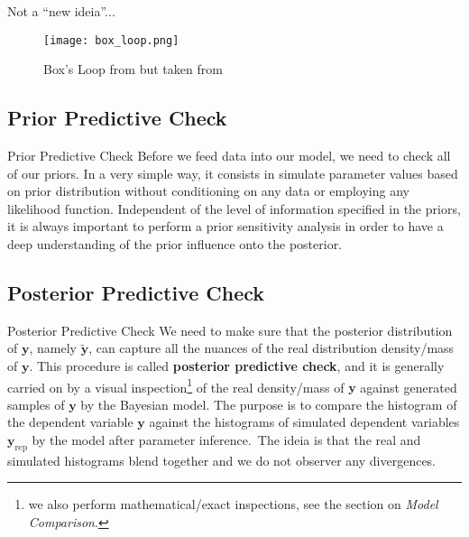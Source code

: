 \begin{frame}{Not a ``new ideia''...}
	\centering
	\begin{figure}
		\texttt{[image: box\_loop.png]}
		\caption{Box's Loop from \textcite{boxScienceStatistics1976}
			but taken from \textcite{Blei_Workflow2014}}
	\end{figure}
\end{frame}

\subsection{Prior Predictive Check}
\begin{frame}{Prior Predictive Check}
	Before we feed data into our model,
	we need to check all of our priors.
	\vfill
	In a very simple way, it consists in simulate parameter values based on
	prior distribution without conditioning on any data or employing any
	likelihood function.
	\vfill
	Independent of the level of information specified in the priors,
	it is always important to perform a prior sensitivity analysis
	in order to have a deep understanding of the prior influence onto
	the posterior.
\end{frame}

\subsection{Posterior Predictive Check}
\begin{frame}{Posterior Predictive Check}
	We need to make sure that the posterior distribution of $\mathbf{y}$,
	namely $\boldsymbol{\tilde{y}}$,
	can capture all the nuances of the real distribution density/mass of $\mathbf{y}$.
	\vfill
	This procedure is called \textbf{posterior predictive check},
	and it is generally carried on by a visual inspection\footnote{
		we also perform mathematical/exact inspections,
		see the section on \textit{Model Comparison}.}
	of the real density/mass of $\mathbf{y}$ against generated samples
	of $\mathbf{y}$ by the Bayesian model.
	\vfill
	The purpose is to compare the histogram of the dependent variable $\mathbf{y}$
	against the histograms of simulated dependent variables $\mathbf{y}_{\text{rep}}$
	by the model after parameter inference.\
	The ideia is that the real and simulated histograms blend together and
	we do not observer any divergences.
\end{frame}

